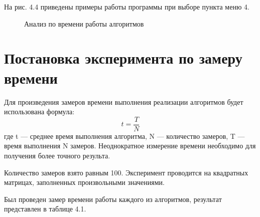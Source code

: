 \documentclass[12pt]{report}
\begin{document}
\newpage
На рис. 4.4 приведены примеры работы программы при выборе пункта меню 4.

\begin{figure}[h]
	\caption{Анализ по времени работы алгоритмов}
	\label{figure:image}
\end{figure}
 
\newpage
\section{Постановка эксперимента по замеру времени}

Для произведения замеров времени выполнения реализации алгоритмов будет использована формула: \begin{equation}\label{eq:fourierrow}
	t = \frac{T}{N}
\end{equation}
где t — среднее время выполнения алгоритма, N — количество замеров, T — время выполнения N замеров.  
Неоднократное измерение времени необходимо для получения более точного результа.  
 
 Количество замеров взято равным 100. Эксперимент проводится на квадратных матрицах, заполненных произвольными значениями.
 
 Был проведен замер времени работы каждого из алгоритмов, результат представлен в таблице 4.1. \vspace{\baselineskip}
 
\end{document}
